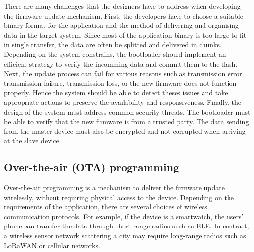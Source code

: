 \justify
There are many challenges that the designers have to address when developing 
the firmware update mechanism. First, the developers have to choose a suitable
binary format for the application and the method of delivering and organising
data in the target system. Since most of the application binary is too large 
to fit in single transfer, the data are often be splitted and delivered in chunks.
Depending on the system constrains, the bootloader should implement an efficient 
strategy to verify the incomming data and commit them to the flash. Next, the
update process can fail for various reasons such as transmission error, 
transmission failure, transmission loss, or the new firmware does not function
properly. Hence the system should be able to detect theses issues and take 
appropriate actions to preserve the availability and responsiveness. Finally,
the design of the system must address common security threats. The bootloader 
must be able to verify that the new firmware is from a trusted party. The data
sending from the master device must also be encrypted and not corrupted when 
arriving at the slave device. 


\subsection{Over-the-air (OTA) programming}
\justify
Over-the-air programming is a mechanism to deliver the firmware update wirelessly, 
without requiring physical access to the device. Depending on the requirements 
of the application, there are several choices of wireless communication protocols. 
For example, if the device is a smartwatch, the users' phone can transfer the data 
through short-range radios such as BLE. In contrast, a wireless sensor network 
scattering a city may require long-range radios such as LoRaWAN or cellular 
networks. 




